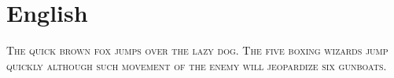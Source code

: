 
\presection\section*{\checkyes English}\postsection

\noindent\textsc{The quick brown fox jumps over the lazy dog.
The five boxing wizards jump quickly although such movement 
of the enemy will jeopardize six gunboats.}